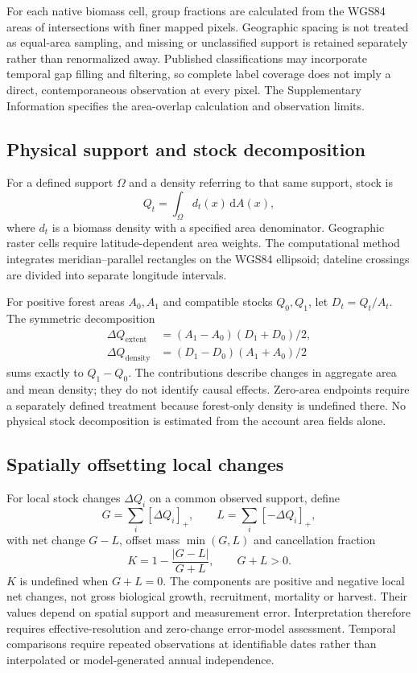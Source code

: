 \documentclass[11pt,a4paper]{article}
\begin{document}
For each native biomass cell, group fractions are calculated from the WGS84 areas of intersections with finer mapped pixels. Geographic spacing is not treated as equal-area sampling, and missing or unclassified support is retained separately rather than renormalized away. Published classifications may incorporate temporal gap filling and filtering, so complete label coverage does not imply a direct, contemporaneous observation at every pixel. The Supplementary Information specifies the area-overlap calculation and observation limits.

\subsection{Physical support and stock decomposition}
For a defined support $\Omega$ and a density referring to that same support, stock is
\[
Q_t=\int_{\Omega} d_t(x)\,\mathrm dA(x),
\]
where $d_t$ is a biomass density with a specified area denominator. Geographic raster cells require latitude-dependent area weights. The computational method integrates meridian--parallel rectangles on the WGS84 ellipsoid; dateline crossings are divided into separate longitude intervals.

For positive forest areas $A_0,A_1$ and compatible stocks $Q_0,Q_1$, let $D_t=Q_t/A_t$. The symmetric decomposition
\begin{align}
\Delta Q_{\mathrm{extent}}&=(A_1-A_0)(D_1+D_0)/2,\label{eq:extent}\\
\Delta Q_{\mathrm{density}}&=(D_1-D_0)(A_1+A_0)/2\label{eq:density}
\end{align}
sums exactly to $Q_1-Q_0$. The contributions describe changes in aggregate area and mean density; they do not identify causal effects. Zero-area endpoints require a separately defined treatment because forest-only density is undefined there. No physical stock decomposition is estimated from the account area fields alone.

\subsection{Spatially offsetting local changes}
For local stock changes $\Delta Q_i$ on a common observed support, define
\[
G=\sum_i[\Delta Q_i]_+,\qquad L=\sum_i[-\Delta Q_i]_+,
\]
with net change $G-L$, offset mass $\min(G,L)$ and cancellation fraction
\begin{equation}
K=1-\frac{|G-L|}{G+L},\qquad G+L>0.\label{eq:cancel}
\end{equation}
$K$ is undefined when $G+L=0$. The components are positive and negative local net changes, not gross biological growth, recruitment, mortality or harvest. Their values depend on spatial support and measurement error. Interpretation therefore requires effective-resolution and zero-change error-model assessment. Temporal comparisons require repeated observations at identifiable dates rather than interpolated or model-generated annual independence.
\end{document}
